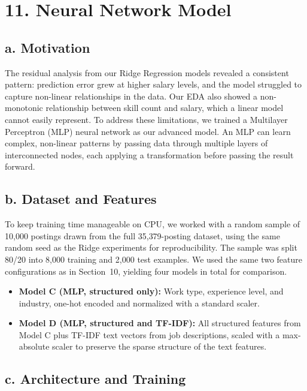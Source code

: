 \documentclass[11pt]{article}
\begin{document}
\section*{11. Neural Network Model}

\subsection*{a. Motivation}

The residual analysis from our Ridge Regression models revealed a consistent pattern: prediction error grew at higher salary levels, and the model struggled to capture non-linear relationships in the data. Our EDA also showed a non-monotonic relationship between skill count and salary, which a linear model cannot easily represent. To address these limitations, we trained a Multilayer Perceptron (MLP) neural network as our advanced model. An MLP can learn complex, non-linear patterns by passing data through multiple layers of interconnected nodes, each applying a transformation before passing the result forward.

\subsection*{b. Dataset and Features}

To keep training time manageable on CPU, we worked with a random sample of 10{,}000 postings drawn from the full 35{,}379-posting dataset, using the same random seed as the Ridge experiments for reproducibility. The sample was split 80/20 into 8{,}000 training and 2{,}000 test examples. We used the same two feature configurations as in Section~10, yielding four models in total for comparison.

\begin{itemize}
    \item \textbf{Model C (MLP, structured only):} Work type, experience level, and industry, one-hot encoded and normalized with a standard scaler.
    \item \textbf{Model D (MLP, structured and TF-IDF):} All structured features from Model C plus TF-IDF text vectors from job descriptions, scaled with a max-absolute scaler to preserve the sparse structure of the text features.
\end{itemize}

\subsection*{c. Architecture and Training}
\end{document}
